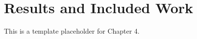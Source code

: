 \chapter{Results and Included Work}
\label{chap:papers}

This is a template placeholder for Chapter 4.

